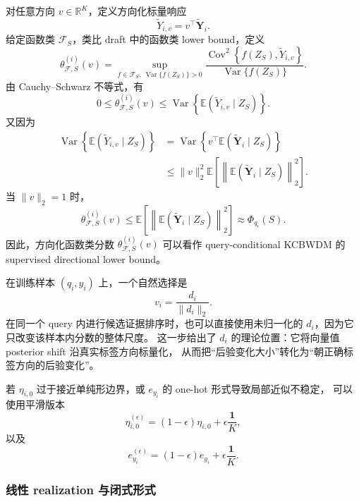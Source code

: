 \documentclass[UTF8,a4paper,12pt,oneside]{ctexart}
\numberwithin{equation}{section}
\begin{document}
对任意方向 \(v\in\mathbb R^K\)，定义方向化标量响应
\[
    \widetilde Y_{i,v}
    =
    v^\top \widetilde{\mathbf Y}_i.
\]
给定函数类 \(\mathcal F_S\)，类比 draft 中的函数类 lower bound，定义
\[
    \theta_{\mathcal F,S}^{(i)}(v)
    =
    \sup_{f\in\mathcal F_S,\ \operatorname{Var}\{f(Z_S)\}>0}
    \frac{
        \operatorname{Cov}^2
        \left\{
            f(Z_S),
            \widetilde Y_{i,v}
        \right\}
    }{
        \operatorname{Var}\{f(Z_S)\}
    }.
\]
由 Cauchy--Schwarz 不等式，有
\[
    0
    \le
    \theta_{\mathcal F,S}^{(i)}(v)
    \le
    \operatorname{Var}
    \left\{
        \mathbb E(\widetilde Y_{i,v}\mid Z_S)
    \right\}.
\]
又因为
\[
\begin{aligned}
    \operatorname{Var}
    \left\{
        \mathbb E(\widetilde Y_{i,v}\mid Z_S)
    \right\}
    &=
    \operatorname{Var}
    \left\{
        v^\top
        \mathbb E(\widetilde{\mathbf Y}_i\mid Z_S)
    \right\} \\
    &\le
    \|v\|_2^2
    \mathbb E
    \left[
        \left\|
            \mathbb E(\widetilde{\mathbf Y}_i\mid Z_S)
        \right\|_2^2
    \right].
\end{aligned}
\]
当 \(\|v\|_2=1\) 时，
\[
    \theta_{\mathcal F,S}^{(i)}(v)
    \le
    \mathbb E
    \left[
        \left\|
            \mathbb E(\widetilde{\mathbf Y}_i\mid Z_S)
        \right\|_2^2
    \right]
    \approx
    \Phi_{q_i}(S).
\]
因此，方向化函数类分数
\(\theta_{\mathcal F,S}^{(i)}(v)\)
可以看作 query-conditional KCBWDM 的 supervised directional lower bound。

在训练样本 \((q_i,y_i)\) 上，一个自然选择是
\[
    v_i
    =
    \frac{d_i}{\|d_i\|_2}.
\]
在同一个 query 内进行候选证据排序时，也可以直接使用未归一化的 \(d_i\)，因为它只改变该样本内分数的整体尺度。
这一步给出了 \(d_i\) 的理论位置：它将向量值 posterior shift 沿真实标签方向标量化，
从而把“后验变化大小”转化为“朝正确标签方向的后验变化”。

若 \(\eta_{i,0}\) 过于接近单纯形边界，或 \(e_{y_i}\) 的 one-hot 形式导致局部近似不稳定，
可以使用平滑版本
\[
    \eta_{i,0}^{(\epsilon)}
    =
    (1-\epsilon)\eta_{i,0}
    +
    \epsilon\frac{\mathbf 1}{K},
\]
以及
\[
    e_{y_i}^{(\epsilon)}
    =
    (1-\epsilon)e_{y_i}
    +
    \epsilon\frac{\mathbf 1}{K}.
\]

\subsubsection{线性 realization 与闭式形式}
\end{document}
